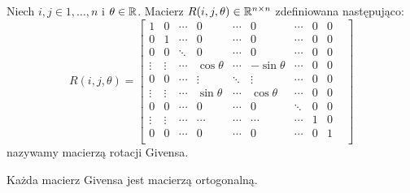 \documentclass[12pt,a4paper]{report}
\newcommand{\mx}[1]{{#1}}
\begin{document}
\begin{definition}
Niech $ i,j \in {1, \ldots, n}$ i $\theta \in \mathbb{R}$. Macierz $\mx{R}(i,j,\theta) \in \setR^{n\times n}$ zdefiniowana następująco:
$$
\mx{R}(i,j,\theta) = \begin{bmatrix}
1       & 0     & \cdots &    0       & \cdots &    0       & \cdots & 0 & 0& \\
0       & 1     & \cdots &     0      & \cdots &     0      &  \cdots& 0 & 0 &   \\
0       & 0     & \ddots &     0      &  \cdots&     0      &  \cdots& 0 & 0 &  \\
\vdots  &\vdots &  \cdots& \cos\theta & \cdots & -\sin\theta&  \cdots& 0 & 0& \\
0       &  0    & \cdots & \vdots     &  \ddots&  \vdots    & \cdots & 0 & 0& \\
\vdots  & \vdots& \cdots & \sin\theta & \cdots & \cos\theta &  \cdots& 0 & 0& \\
0       & 0     & \cdots &    0       &  \cdots&  0         & \ddots &  0& 0& \\
\vdots  & \vdots&\cdots  &  \cdots    &  \cdots&  \cdots    & \cdots & 1 & 0&\\
0       & 0     & \cdots &     0      &  \cdots&    0       &  \cdots& 0 & 1 & \\       
\end{bmatrix}
$$
nazywamy macierzą rotacji Givensa.
\end{definition}

\begin{lemma}
Każda macierz Givensa jest macierzą ortogonalną.
\end{lemma}
\end{document}
